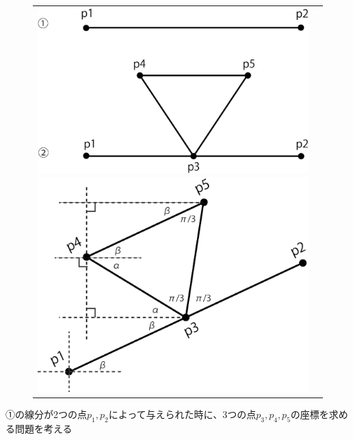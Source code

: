 \documentclass[uplatex,a4paper,11pt,oneside,openany]{jsbook}
\begin{document}
\begin{figure}[H]
  \centering
  \begin{tabular}{cc}
      \begin{minipage}{0.5\hsize}
      \centering
\includegraphics[keepaspectratio,clip,scale=0.45]{../src/figure/kochf2.eps}
      \end{minipage}
      \begin{minipage}{0.5\hsize}
      \centering
\includegraphics[keepaspectratio,clip,scale=0.45]{../src/figure/kochf5.eps}
      \end{minipage}
    \end{tabular}
\end{figure}%

①の線分が2つの点$p_1,p_2$によって与えられた時に、3つの点$p_3,p_4,p_5$の座標を求める問題を考える
\end{document}
